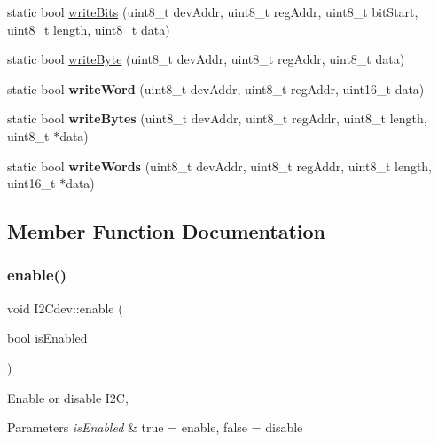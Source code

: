 \begin{DoxyCompactItemize}
static bool \mbox{\hyperlink{class_i2_cdev_a913371251b6a41520c080115650e1b59}{write\+Bits}} (uint8\+\_\+t dev\+Addr, uint8\+\_\+t reg\+Addr, uint8\+\_\+t bit\+Start, uint8\+\_\+t length, uint8\+\_\+t data)
\item 
static bool \mbox{\hyperlink{class_i2_cdev_aeb297637ef985cd562da465ba61b7042}{write\+Byte}} (uint8\+\_\+t dev\+Addr, uint8\+\_\+t reg\+Addr, uint8\+\_\+t data)
\item 
\mbox{\label{class_i2_cdev_acbe68a802d6a177301736e60bedd1def}} 
static bool {\bfseries write\+Word} (uint8\+\_\+t dev\+Addr, uint8\+\_\+t reg\+Addr, uint16\+\_\+t data)
\item 
\mbox{\label{class_i2_cdev_aa4e39cac6c0eac5112f9132084bcc93e}} 
static bool {\bfseries write\+Bytes} (uint8\+\_\+t dev\+Addr, uint8\+\_\+t reg\+Addr, uint8\+\_\+t length, uint8\+\_\+t $\ast$data)
\item 
\mbox{\label{class_i2_cdev_aae37c0526e4b4730a5b2ffd752fd8b21}} 
static bool {\bfseries write\+Words} (uint8\+\_\+t dev\+Addr, uint8\+\_\+t reg\+Addr, uint8\+\_\+t length, uint16\+\_\+t $\ast$data)
\end{DoxyCompactItemize}


\subsection{Member Function Documentation}
\mbox{\label{class_i2_cdev_ab1fc6fb228f54f717cf317646a5751fc}} 
\subsubsection{\texorpdfstring{enable()}{enable()}}
{\footnotesize\ttfamily void I2\+Cdev\+::enable (\begin{DoxyParamCaption}\item[{bool}]{is\+Enabled }\end{DoxyParamCaption})\hspace{0.3cm}{\ttfamily [static]}}

Enable or disable I2C, 
\begin{DoxyParams}{Parameters}
{\em is\+Enabled} & true = enable, false = disable \\
\hline
\end{DoxyParams}
\mbox{\label{class_i2_cdev_ac10d46777131c57b8446e70ed85561ec}} 
